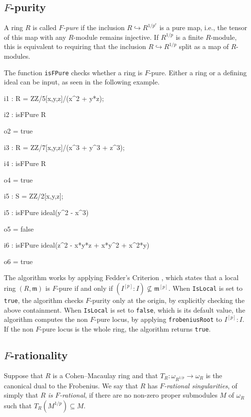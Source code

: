 \documentclass{amsart}
\begin{document}
\subsection{$F$-purity}
\begin{definition}
A ring $R$ is called \emph{$F$-pure} if
the inclusion $R \hookrightarrow R^{1/p^{e}}$ is a pure map, i.e.,
the tensor of this map with any $R$-module remains injective.  If $R^{1/p}$ is a finite $R$-module, this is equivalent to requiring that the inclusion $R \hookrightarrow R^{1/p}$ split as a map of $R$-modules.
\end{definition}

The function \texttt{isFPure} checks whether a ring is $F$-pure.
Either a ring or a defining ideal can be input, as seen in the following example.


\medskip
{\small{}
\begin{MyVerbatim}
i1 : R = ZZ/5[x,y,z]/(x^2 + y*z);

i2 : isFPure R

o2 = true

i3 : R = ZZ/7[x,y,z]/(x^3 + y^3 + z^3);

i4 : isFPure R

o4 = true

i5 : S = ZZ/2[x,y,z];

i5 : isFPure ideal(y^2 - x^3)

o5 = false

i6 : isFPure ideal(z^2 - x*y*z + x*y^2 + x^2*y)

o6 = true
\end{MyVerbatim}
}\medskip


The algorithm works by applying Fedder's Criterion {\cite{FedderFPureRat}}, which states that a
local ring $(R, \mathfrak{m})$ is $F$-pure if and only if $(I^{[p]} : I)
\not\subseteq \mathfrak{m}^{[p]}$.
When \texttt{IsLocal} is set to \texttt{true}, the algorithm checks $F$-purity only at the origin, by explicitly checking the above
containment. When \texttt{IsLocal} is set to \texttt{false}, which is its default value, the
algorithm computes the non $F$-pure locus, by applying \texttt{frobeniusRoot}
to $I^{[p]} :I$. If the non $F$-pure locus is the whole ring, the algorithm
returns \texttt{true}.


\subsection{$F$-rationality}

\begin{definition}
Suppose that $R$ is a Cohen--Macaulay ring and that $T_{R} :
\omega_{R^{1/p}} \rightarrow \omega_{R}$ is the canonical dual to the
Frobenius. We say that $R$ has \emph{$F$-rational singularities}, of simply that \emph{$R$ is $F$-rational}, if there
are no non-zero proper submodules $M$ of $\omega_{R}$ such that
$T_{R}(M^{1/p}) \subseteq M$.
\end{definition}
\end{document}
